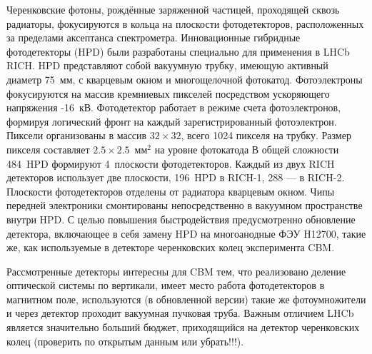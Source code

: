 Черенковские фотоны, рождённые заряженной частицей, проходящей сквозь радиаторы, фокусируются в кольца на плоскости фотодетекторов, расположенных за пределами аксептанса спектрометра. Инновационные гибридные фотодетекторы (HPD) были разработаны специально для применения в LHCb RICH. HPD представляют собой вакуумную трубку, имеющую активный диаметр 75~мм, с кварцевым окном и многощелочной фотокатод. Фотоэлектроны фокусируются на массив кремниевых пикселей посредством ускоряющего напряжения -16~кВ. Фотодетектор работает в режиме счета фотоэлектронов, формируя логический фронт на каждый зарегистрированный фотоэлектрон. Пиксели организованы в массив $32 \times 32$, всего 1024 пикселя на трубку. Размер пикселя составляет $2.5 \times 2.5$~мм$^{2}$ на уровне фотокатода \todo В общей сложности 484~HPD формируют 4~плоскости фотодетекторов. Каждый из двух RICH детекторов использует две плоскости, 196~HPD в \mbox{RICH-1}, 288 --- в \mbox{RICH-2}.
Плоскости фотодетекторов отделены от радиатора кварцевым окном. Чипы передней электроники смонтированы непосредственно в вакуумном пространстве внутри HPD. С целью повышения быстродействия предусмотренно обновление детектора, включающее в себя замену HPD на многоанодные ФЭУ H12700, такие же, как используемые в детекторе черенковских колец эксперимента CBM.

Рассмотренные детекторы интересны для CBM тем, что реализовано деление оптической системы по вертикали, имеет место работа фотодетекторов в магнитном поле, используются (в обновленной версии) такие же фотоумножители и через детектор проходит вакуумная пучковая труба.
Важным отличием LHCb является значительно больший бюджет, приходящийся на детектор черенковских колец (проверить по открытым данным или убрать!!!).



